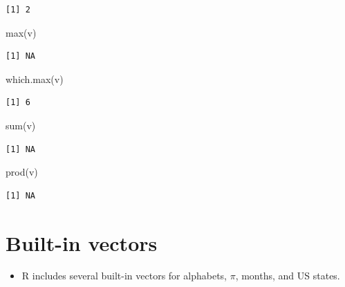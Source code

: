 \documentclass[
  letterpaper,
  DIV=11,
  numbers=noendperiod]{scrreprt}
\newenvironment{Shaded}{\begin{snugshade}}{\end{snugshade}}
\newcommand{\FunctionTok}[1]{\textcolor[rgb]{0.28,0.35,0.67}{#1}}
\newcommand{\NormalTok}[1]{\textcolor[rgb]{0.00,0.23,0.31}{#1}}
\providecommand{\tightlist}{%
  \setlength{\itemsep}{0pt}\setlength{\parskip}{0pt}}\usepackage{longtable,booktabs,array}
\begin{document}
\begin{tcolorbox}
\begin{verbatim}
[1] 2
\end{verbatim}

\begin{Shaded}
\begin{Highlighting}[]
\FunctionTok{max}\NormalTok{(v)}
\end{Highlighting}
\end{Shaded}

\begin{verbatim}
[1] NA
\end{verbatim}

\begin{Shaded}
\begin{Highlighting}[]
\FunctionTok{which.max}\NormalTok{(v)}
\end{Highlighting}
\end{Shaded}

\begin{verbatim}
[1] 6
\end{verbatim}

\begin{Shaded}
\begin{Highlighting}[]
\FunctionTok{sum}\NormalTok{(v)}
\end{Highlighting}
\end{Shaded}

\begin{verbatim}
[1] NA
\end{verbatim}

\begin{Shaded}
\begin{Highlighting}[]
\FunctionTok{prod}\NormalTok{(v)}
\end{Highlighting}
\end{Shaded}

\begin{verbatim}
[1] NA
\end{verbatim}

\end{tcolorbox}

\section{Built-in vectors}\label{built-in-vectors}

\begin{itemize}
\tightlist
\item
  R includes several built-in vectors for alphabets, \(\pi\), months,
  and US states.
\end{itemize}
\end{document}
